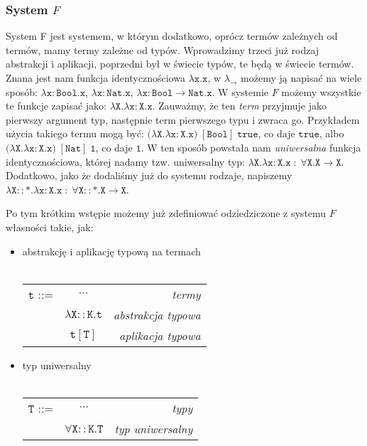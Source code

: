 \documentclass[11pt,leqno]{article}
\begin{document}
\subsubsection{System $F$}

System F jest systemem, w którym dodatkowo, oprócz termów zależnych od termów, mamy termy zależne od typów. Wprowadzimy trzeci już rodzaj abstrakcji i aplikacji, poprzedni był w świecie typów, te będą w świecie termów. Znana jest nam funkcja identycznościowa $\mathtt{\lambda x.x}$, w $\lambda_{\rightarrow}$ możemy ją napisać na wiele sposób: $\mathtt{\lambda x:Bool.x}$, $\mathtt{\lambda x:Nat.x}$, $\mathtt{\lambda x:Bool \rightarrow Nat.x}$. W systemie $F$ możemy wszystkie te funkcje zapisać jako: $\mathtt{\lambda X. \lambda x:X.x}$. Zauważmy, że ten \textit{term} przyjmuje jako pierwszy argument typ, następnie term pierwszego typu i zwraca go. Przykładem użycia takiego termu mogą być: $(\mathtt{\lambda X. \lambda x:X.x)\;[Bool]\;true}$, co daje $\mathtt{true}$, albo $(\mathtt{\lambda X. \lambda x:X.x)\;[Nat]\;1}$, co daje $\mathtt{1}$. W ten sposób powstała nam \textit{uniwersalna} funkcja identycznościowa, której nadamy tzw. uniwersalny typ: $\mathtt{\lambda X. \lambda x:X.x \; : \; \forall X.X \rightarrow X}$. Dodatkowo, jako że dodaliśmy już do systemu rodzaje, napiszemy $\mathtt{\lambda X::\ast. \lambda x:X.x \; : \; \forall X::\ast.X \rightarrow X}$. 


Po tym krótkim wstępie możemy już zdefiniować odziedziczone z systemu $F$ własności takie, jak:  
\begin{itemize}
    \item abstrakcję i aplikację typową na termach \\ \\
\begin{tabular}{| l c r |}
  \hline
  $\mathtt{t}$ ::= & $\cdots$ & \textit{termy} \\
   & $\mathtt{\lambda X::K.t}$ & \textit{abstrakcja typowa} \\
   & $\mathtt{t[T]}$ & \textit{aplikacja typowa} \\
  \hline
\end{tabular}

    \item typ uniwersalny \\ \\
\begin{tabular}{| l c r |}
  \hline
  $\mathtt{T}$ ::= & $\cdots$ & \textit{typy}  \\
   & $\mathtt{\forall X::K.T}$ & \textit{typ uniwersalny} \\
  \hline
\end{tabular}

\end{itemize}
\end{document}
